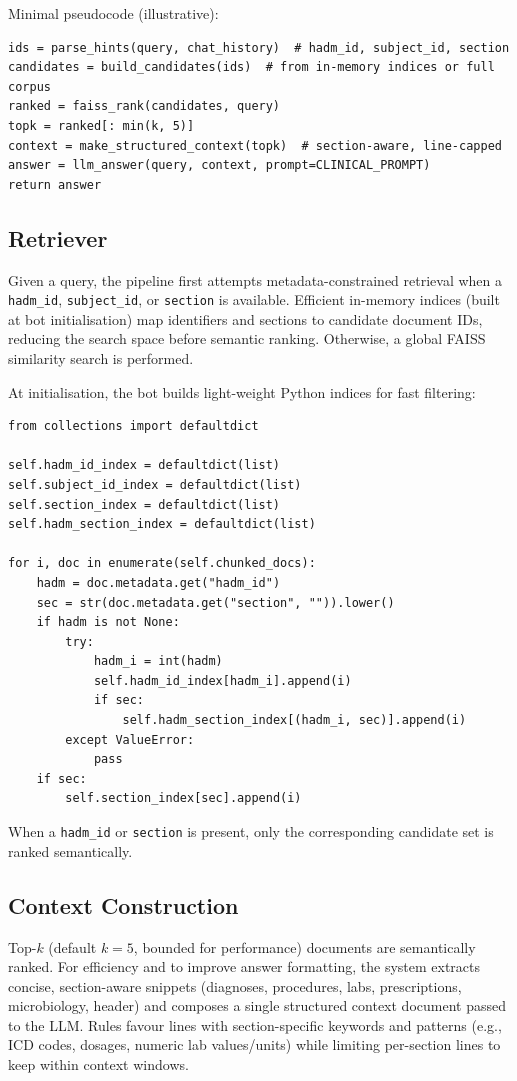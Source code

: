 \noindent Minimal pseudocode (illustrative):
\begin{verbatim}
ids = parse_hints(query, chat_history)  # hadm_id, subject_id, section
candidates = build_candidates(ids)  # from in-memory indices or full corpus
ranked = faiss_rank(candidates, query)
topk = ranked[: min(k, 5)]
context = make_structured_context(topk)  # section-aware, line-capped
answer = llm_answer(query, context, prompt=CLINICAL_PROMPT)
return answer
\end{verbatim}

\subsection{Retriever}
Given a query, the pipeline first attempts metadata-constrained retrieval when a \texttt{hadm\_id}, \texttt{subject\_id}, or \texttt{section} is available. Efficient in-memory indices (built at bot initialisation) map identifiers and sections to candidate document IDs, reducing the search space before semantic ranking. Otherwise, a global FAISS similarity search is performed.

\smallskip
\noindent At initialisation, the bot builds light-weight Python indices for fast filtering:
\begin{verbatim}
from collections import defaultdict

self.hadm_id_index = defaultdict(list)
self.subject_id_index = defaultdict(list)
self.section_index = defaultdict(list)
self.hadm_section_index = defaultdict(list)

for i, doc in enumerate(self.chunked_docs):
    hadm = doc.metadata.get("hadm_id")
    sec = str(doc.metadata.get("section", "")).lower()
    if hadm is not None:
        try:
            hadm_i = int(hadm)
            self.hadm_id_index[hadm_i].append(i)
            if sec:
                self.hadm_section_index[(hadm_i, sec)].append(i)
        except ValueError:
            pass
    if sec:
        self.section_index[sec].append(i)
\end{verbatim}

\noindent When a \texttt{hadm\_id} or \texttt{section} is present, only the corresponding candidate set is ranked semantically.

\subsection{Context Construction}
Top-$k$ (default \(k=5\), bounded for performance) documents are semantically ranked. For efficiency and to improve answer formatting, the system extracts concise, section-aware snippets (diagnoses, procedures, labs, prescriptions, microbiology, header) and composes a single structured context document passed to the LLM. Rules favour lines with section-specific keywords and patterns (e.g., ICD codes, dosages, numeric lab values/units) while limiting per-section lines to keep within context windows.

